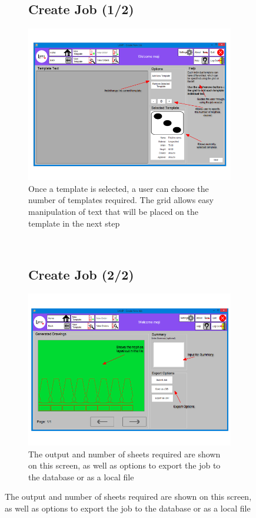 \documentclass[oneside,openany,11pt,a4paper]{report}
\begin{document}
\begin{figure}[H]
	\begin{subfigure}[t]{0.5\textwidth}
	\subsection{Create Job (1/2)}

		\centering
		\includegraphics[width=\textwidth]{screen/createjob.png}
		\caption{Once a template is selected, a user can choose the number of templates required. The grid allows easy manipulation of text that will be placed on the template in the next step}

	\end{subfigure}
	~
	\begin{subfigure}[t]{0.5\textwidth}
		\subsection{Create Job (2/2)}

			\centering
			\includegraphics[width=\textwidth]{screen/submitjob.png}
			\caption{The output and number of sheets required are shown on this screen, as well as options to export the job to the database or as a local file}
	\end{subfigure}
\end{figure}
\end{document}
